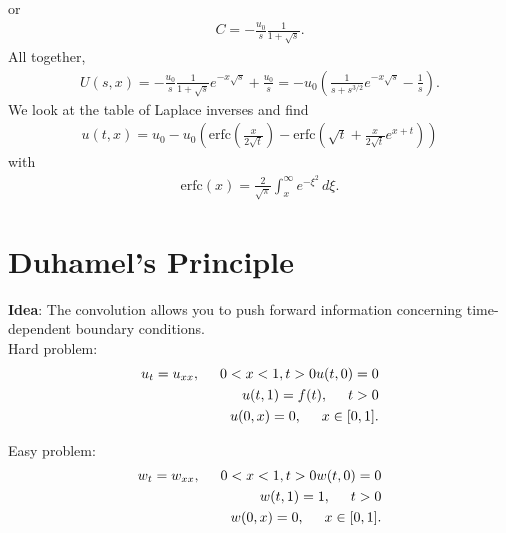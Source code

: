 \documentclass{article}
\theoremstyle{definition}
\newcommand{\f}[2]{\frac{#1}{#2}}
\newcommand{\lp}{\left(}
\newcommand{\rp}{\right)}
\begin{document}
or
\begin{align*}
C = -\f{u_0}{s}\f{1}{1 + \sqrt{s}}.
\end{align*}
All together,
\begin{align*}
U(s,x) = -\f{u_0}{s}\f{1}{1 + \sqrt{s}}e^{-x\sqrt{s}} + \f{u_0}{s} = -u_0 \lp \f{1}{s + s^{3/2}}e^{-x\sqrt{s}} - \f{1}{s} \rp.
\end{align*}
We look at the table of Laplace inverses and find
\begin{align*}
u(t,x) = u_0 - u_0 \lp \text{erfc}\lp\f{x}{2\sqrt{t}}\rp - \text{erfc}\lp \sqrt{t} + \f{x}{2\sqrt{t}}e^{x+t} \rp \rp
\end{align*}
with
\begin{align*}
\text{erfc}(x) = \f{2}{\sqrt{\pi}}\int^\infty_x e^{-\xi^2}\,d\xi.
\end{align*}























\newpage

\section{Duhamel's Principle}


\textbf{Idea}: The convolution allows you to push forward information concerning time-dependent boundary conditions. \\

Hard problem:
\begin{align*}
u_t = u_{xx}, \hspace{0.5cm} 0 < x < 1, t>0
u(t,0) = 0\\
u(t,1) = f(t),\hspace{0.5cm} t>0\\
u(0,x) = 0, \hspace{0.5cm} x\in [0,1].
\end{align*}


Easy problem:
\begin{align*}
w_t = w_{xx}, \hspace{0.5cm} 0 < x < 1, t>0
w(t,0) = 0\\
w(t,1) = 1,\hspace{0.5cm} t >0\\
w(0,x) = 0, \hspace{0.5cm} x\in [0,1].
\end{align*}
\end{document}
